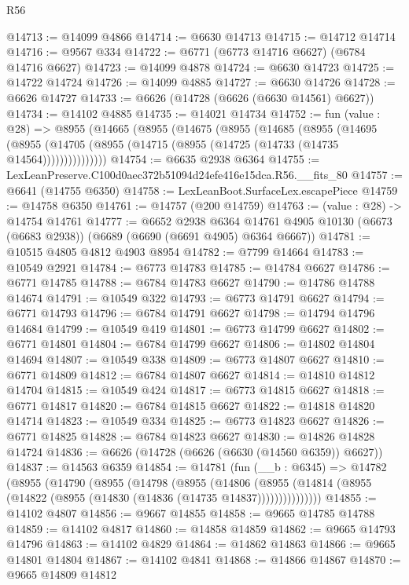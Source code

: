\begin{lexlean}{R56}
\begin{coremodule}
@14713 := @14099 @4866
@14714 := @6630 @14713
@14715 := @14712 @14714
@14716 := @9567 @334
@14722 := @6771 (@6773 @14716 @6627) (@6784 @14716 @6627)
@14723 := @14099 @4878
@14724 := @6630 @14723
@14725 := @14722 @14724
@14726 := @14099 @4885
@14727 := @6630 @14726
@14728 := @6626 @14727
@14733 := @6626 (@14728 (@6626 (@6630 @14561) @6627))
@14734 := @14102 @4885
@14735 := @14021 @14734
@14752 := fun (value : @28) =>
  @8955
    (@14665
      (@8955
        (@14675
          (@8955
            (@14685
              (@8955
                (@14695
                  (@8955 (@14705 (@8955 (@14715 (@8955 (@14725 (@14733 (@14735 @14564)))))))))))))))
@14754 := @6635 @2938 @6364
@14755 := LexLeanPreserve.C100d0aec372b51094d24efe416e15dca.R56.__fits_80
@14757 := @6641 (@14755 @6350)
@14758 := LexLeanBoot.SurfaceLex.escapePiece
@14759 := @14758 @6350
@14761 := @14757 (@200 @14759)
@14763 := (value : @28) -> @14754 @14761
@14777 := @6652
    @2938
    @6364
    @14761
    @4905
    @10130
    (@6673 (@6683 @2938))
    (@6689 (@6690 (@6691 @4905) @6364 @6667))
@14781 := @10515 @4805 @4812 @4903 @8954
@14782 := @7799 @14664
@14783 := @10549 @2921
@14784 := @6773 @14783
@14785 := @14784 @6627
@14786 := @6771 @14785
@14788 := @6784 @14783 @6627
@14790 := @14786 @14788 @14674
@14791 := @10549 @322
@14793 := @6773 @14791 @6627
@14794 := @6771 @14793
@14796 := @6784 @14791 @6627
@14798 := @14794 @14796 @14684
@14799 := @10549 @419
@14801 := @6773 @14799 @6627
@14802 := @6771 @14801
@14804 := @6784 @14799 @6627
@14806 := @14802 @14804 @14694
@14807 := @10549 @338
@14809 := @6773 @14807 @6627
@14810 := @6771 @14809
@14812 := @6784 @14807 @6627
@14814 := @14810 @14812 @14704
@14815 := @10549 @424
@14817 := @6773 @14815 @6627
@14818 := @6771 @14817
@14820 := @6784 @14815 @6627
@14822 := @14818 @14820 @14714
@14823 := @10549 @334
@14825 := @6773 @14823 @6627
@14826 := @6771 @14825
@14828 := @6784 @14823 @6627
@14830 := @14826 @14828 @14724
@14836 := @6626 (@14728 (@6626 (@6630 (@14560 @6359)) @6627))
@14837 := @14563 @6359
@14854 := @14781
    (fun (__b : @6345) =>
    @14782
      (@8955
        (@14790
          (@8955
            (@14798
              (@8955
                (@14806
                  (@8955 (@14814 (@8955 (@14822 (@8955 (@14830 (@14836 (@14735 @14837)))))))))))))))
@14855 := @14102 @4807
@14856 := @9667 @14855
@14858 := @9665 @14785 @14788
@14859 := @14102 @4817
@14860 := @14858 @14859
@14862 := @9665 @14793 @14796
@14863 := @14102 @4829
@14864 := @14862 @14863
@14866 := @9665 @14801 @14804
@14867 := @14102 @4841
@14868 := @14866 @14867
@14870 := @9665 @14809 @14812

\end{coremodule}
\end{lexlean}
